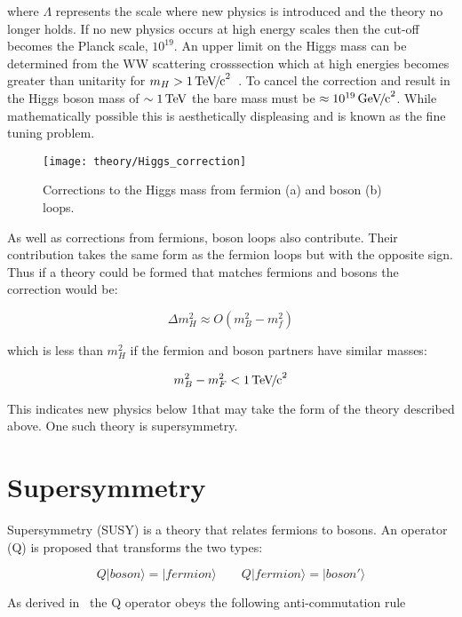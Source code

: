 where $\Lambda$ represents the scale where new physics is introduced and the theory no longer holds. If no new physics occurs at high energy scales then the cut-off becomes the Planck scale, $10^{19}$\GeVcc. An upper limit on the Higgs mass can be determined from the WW scattering crosssection which at high energies becomes greater than unitarity for $m_{H} > 1{\,\mathrm{Te\hspace{-.08em}V\hspace{-0.16em}/\hspace{-0.08em}c}^\mathrm{2}}$~\cite{citeulike:918524}. To cancel the correction and result in the Higgs boson mass of $\sim1\,\mathrm{Te\hspace{-.08em}V}$ the bare mass must be $\approx 10^{19} {\,\mathrm{Ge\hspace{-.08em}V\hspace{-0.16em}/\hspace{-0.08em}c}^\mathrm{2}}$. While mathematically possible this is aesthetically displeasing and is known as the fine tuning problem.

\begin{figure}[bt]
  \centering
  \texttt{[image: theory/Higgs\_correction]}
  \caption{Corrections to the Higgs mass from fermion (a) and boson (b) loops.~\cite{citeulike:681336}
  \label{fig:Higgs_correction}}
\end{figure}

As well as corrections from fermions, boson loops also contribute. Their contribution takes the same form as the fermion loops but with the opposite sign. Thus if a theory could be formed that matches fermions and bosons the correction would be:

\begin{equation}
	\Delta m_{H}^{2} \approx O(m_{B}^2 - m_{f}^2)
\end{equation}

which is less than $m_{H}^2$ if the fermion and boson partners have similar masses:

\begin{equation}
	m_{B}^2 - m_{F}^2 < 1 {\,\mathrm{Te\hspace{-.08em}V\hspace{-0.16em}/\hspace{-0.08em}c}^\mathrm{2}}
\end{equation}

This indicates new physics below 1\TeV that may take the form of the theory described above. One such theory is supersymmetry.

\section{Supersymmetry}
Supersymmetry (SUSY) is a theory that relates fermions to bosons. An operator (Q) is proposed that transforms the two types:

\begin{equation}
	Q|boson\rangle = |fermion\rangle \qquad Q|fermion\rangle = |boson'\rangle
\end{equation}

As derived in~\cite{citeulike:681336} the Q operator obeys the following anti-commutation rule

